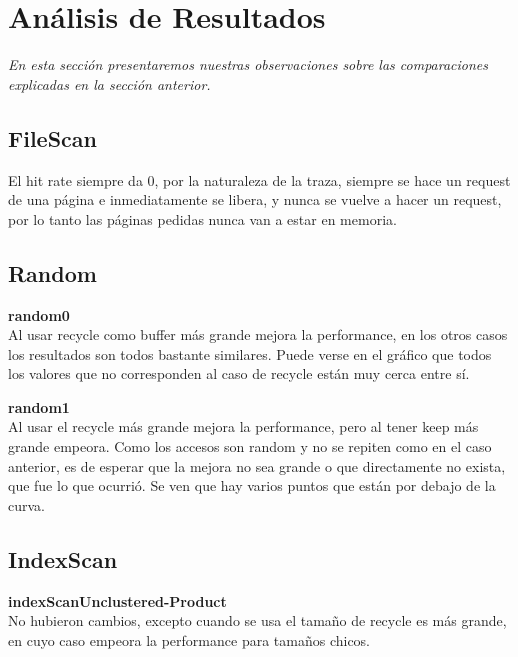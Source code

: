 \section{Análisis de Resultados}

\textsl{En esta secci\'on presentaremos nuestras observaciones
sobre las comparaciones explicadas en la secci\'on anterior.}

\vspace*{0.5cm}

\subsection{FileScan}

El hit rate siempre da 0, por la naturaleza de la traza, siempre se
hace un request de una página e inmediatamente se libera, y nunca 
se vuelve a hacer un request, por lo tanto las páginas pedidas
nunca van a estar en memoria.


\subsection{Random}

\textbf{random0} \\

Al usar recycle como buffer más grande mejora la performance, en
los otros casos los resultados son todos bastante similares.
Puede verse en el gráfico que todos los valores que no corresponden
al caso de recycle están muy cerca entre sí.

\vspace*{0.5cm}

\textbf{random1} \\

Al usar el recycle más grande mejora la performance, pero al 
tener keep más grande empeora. Como los accesos son random y
no se repiten como en el caso anterior, es de esperar que la
mejora no sea grande o que directamente no exista, que fue
lo que ocurrió.
Se ven que hay varios puntos que están por debajo de la curva.


\subsection{IndexScan}

\textbf{indexScanUnclustered-Product} \\

No hubieron cambios, excepto cuando se usa el tamaño de recycle es 
más grande, en cuyo caso empeora la performance para tamaños chicos.

